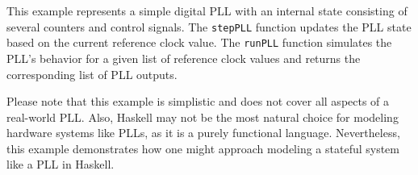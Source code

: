 \documentclass[
]{article}
\newenvironment{Shaded}{}{}
\newcommand{\DataTypeTok}[1]{\textcolor[rgb]{0.56,0.13,0.00}{#1}}
\newcommand{\DecValTok}[1]{\textcolor[rgb]{0.25,0.63,0.44}{#1}}
\newcommand{\FunctionTok}[1]{\textcolor[rgb]{0.02,0.16,0.49}{#1}}
\newcommand{\KeywordTok}[1]{\textcolor[rgb]{0.00,0.44,0.13}{\textbf{#1}}}
\newcommand{\NormalTok}[1]{#1}
\newcommand{\OperatorTok}[1]{\textcolor[rgb]{0.40,0.40,0.40}{#1}}
\newcommand{\OtherTok}[1]{\textcolor[rgb]{0.00,0.44,0.13}{#1}}
\newcommand{\StringTok}[1]{\textcolor[rgb]{0.25,0.44,0.63}{#1}}
\begin{document}
\begin{Shaded}
\end{Shaded}

This example represents a simple digital PLL with an internal state
consisting of several counters and control signals. The \texttt{stepPLL}
function updates the PLL state based on the current reference clock
value. The \texttt{runPLL} function simulates the PLL's behavior for a
given list of reference clock values and returns the corresponding list
of PLL outputs.

Please note that this example is simplistic and does not cover all
aspects of a real-world PLL. Also, Haskell may not be the most natural
choice for modeling hardware systems like PLLs, as it is a purely
functional language. Nevertheless, this example demonstrates how one
might approach modeling a stateful system like a PLL in Haskell.
\end{document}
